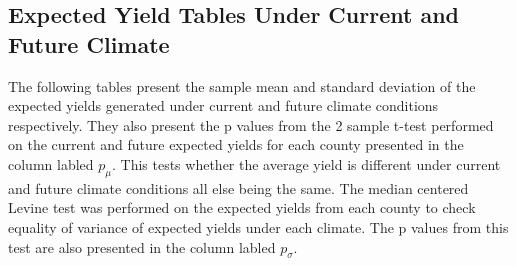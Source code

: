 \subsection{Expected Yield Tables Under Current and Future Climate}

The following tables present the sample mean and standard deviation of the expected yields generated under current and future climate conditions respectively. They also present the p values from the 2 sample t-test performed on the current and future expected yields for each county presented in the column labled $p_{\mu}$. This tests whether the average yield is different under current and future climate conditions all else being the same. The median centered Levine test was performed on the expected yields from each county to check equality of variance of expected yields under each climate. The p values from this test are also presented in the column labled $p_{\sigma}$.




